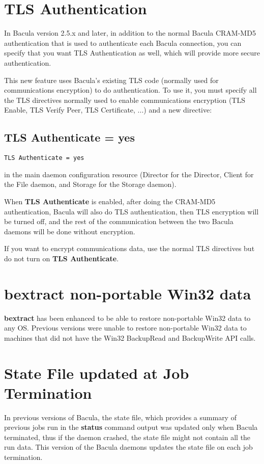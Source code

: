 \section{TLS Authentication}
In Bacula version 2.5.x and later, in addition to the normal Bacula
CRAM-MD5 authentication that is used to authenticate each Bacula
connection, you can specify that you want TLS Authentication as well,
which will provide more secure authentication.

This new feature uses Bacula's existing TLS code (normally used for
communications encryption) to do authentication.  To use it, you must
specify all the TLS directives normally used to enable communications
encryption (TLS Enable, TLS Verify Peer, TLS Certificate, ...) and
a new directive:

\subsection{TLS Authenticate = yes}
\begin{verbatim}
TLS Authenticate = yes
\end{verbatim}

in the main daemon configuration resource (Director for the Director,
Client for the File daemon, and Storage for the Storage daemon).

When {\bf TLS Authenticate} is enabled, after doing the CRAM-MD5
authentication, Bacula will also do TLS authentication, then TLS 
encryption will be turned off, and the rest of the communication between
the two Bacula daemons will be done without encryption.

If you want to encrypt communications data, use the normal TLS directives
but do not turn on {\bf TLS Authenticate}.

\section{bextract non-portable Win32 data}
{\bf bextract} has been enhanced to be able to restore
non-portable Win32 data to any OS.  Previous versions were 
unable to restore non-portable Win32 data to machines that
did not have the Win32 BackupRead and BackupWrite API calls.

\section{State File updated at Job Termination}
In previous versions of Bacula, the state file, which provides a
summary of previous jobs run in the {\bf status} command output was
updated only when Bacula terminated, thus if the daemon crashed, the
state file might not contain all the run data.  This version of
the Bacula daemons updates the state file on each job termination.

